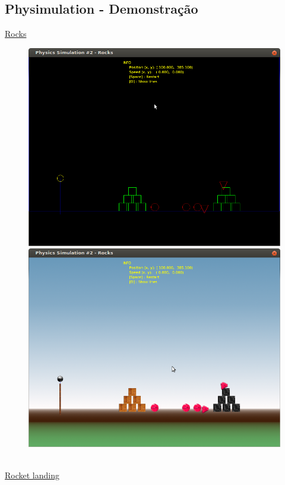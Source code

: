 \documentclass[plainboxedsections]{sciposter}
\begin{document}
\begin{multicols}{2}
  \section*{Physimulation - Demonstração}
  \underline{Rocks}
  \\[1ex]
  \begin{figure}
      \includegraphics[scale=0.6]{esqueleto.png}
      \includegraphics[scale=0.6]{comImagem.png}
  \end{figure}
  \\[1ex]
  \underline{Rocket landing}
  \\[1ex]
  \begin{figure}

\end{figure}
\end{multicols}
\end{document}
